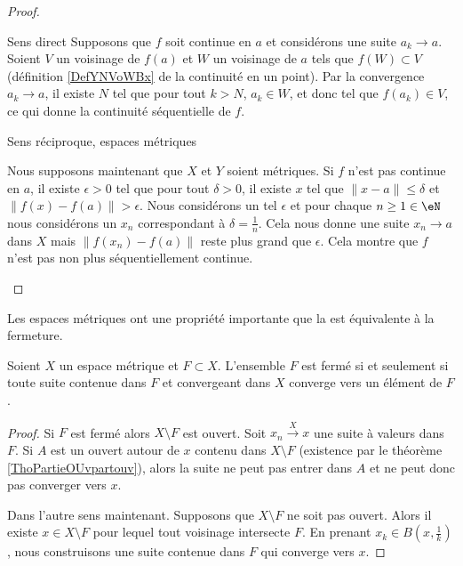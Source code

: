 \begin{proof}
    \begin{subproof}
    \item[Sens direct]
        Supposons que \( f\) soit continue en \( a\) et considérons une suite \( a_k\to a\). Soient \( V\) un voisinage de \( f(a)\) et \( W\) un voisinage de \( a\) tels que \( f(W)\subset V\) (définition \ref{DefYNVoWBx} de la continuité en un point). Par la convergence \( a_k\to a\),  il existe \( N\) tel que pour tout \( k>N\), \( a_k\in W\), et donc tel que \( f(a_k)\in V\), ce qui donne la continuité séquentielle de \( f\).
    \item[Sens réciproque, espaces métriques]

        Nous supposons maintenant que \( X\) et \( Y\) soient métriques. Si \( f\) n'est pas continue en \( a\), il existe \( \epsilon>0\) tel que pour tout \( \delta>0\), il existe \( x\) tel que \( \| x-a \|\leq\delta\) et \( \| f(x)-f(a) \|>\epsilon\). Nous considérons un tel \( \epsilon\) et pour chaque \( n\geq1\in \eN\) nous considérons un \( x_n\) correspondant à \( \delta=\frac{1}{ n }\). Cela nous donne une suite \( x_n\to a\) dans \( X\) mais \( \| f(x_n) -f(a)\|\) reste plus grand que \( \epsilon\). Cela montre que \( f\) n'est pas non plus séquentiellement continue.
    \end{subproof}
\end{proof}

Les espaces métriques ont une propriété importante que la  est équivalente à la fermeture.
\begin{proposition}    \label{PropLFBXIjt}
    Soient \( X\) un espace métrique et \( F\subset X\). L'ensemble \( F\) est fermé si et seulement si toute suite contenue dans \( F\) et convergeant dans \( X\) converge vers un élément de \( F\).
\end{proposition}

\begin{proof}
    Si \( F\) est fermé alors \( X\setminus F\) est ouvert. Soit \( x_n\stackrel{X}{\longrightarrow}x\) une suite à valeurs dans \( F\). Si \( A\) est un ouvert autour de \( x\) contenu dans \( X\setminus F\) (existence par le théorème \ref{ThoPartieOUvpartouv}), alors la suite ne peut pas entrer dans \( A\) et ne peut donc pas converger vers \( x\).

    Dans l'autre sens maintenant. Supposons que \( X\setminus F\) ne soit pas ouvert. Alors il existe \( x\in X\setminus F\) pour lequel tout voisinage intersecte \( F\). En prenant \( x_k\in B(x,\frac{1}{ k })\), nous construisons une suite contenue dans \( F\) qui converge vers \( x\).
\end{proof}

